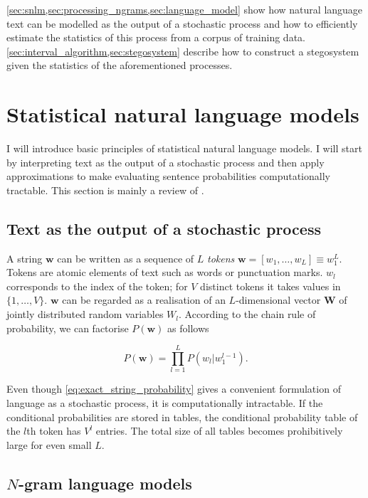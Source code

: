 \documentclass[draft]{IIBproject}
\begin{document}
\cref{sec:snlm,sec:processing_ngrams,sec:language_model} show how natural language text can be modelled as the output of a stochastic process and how to efficiently estimate the statistics of this process from a corpus of training data. \cref{sec:interval_algorithm,sec:stegosystem} describe how to construct a stegosystem given the statistics of the aforementioned processes.

\clearpage
\section{Statistical natural language models}
\label{sec:snlm}

I will introduce basic principles of statistical natural language models. I will start by interpreting text as the output of a stochastic process and then apply approximations to make evaluating sentence probabilities computationally tractable. This section is mainly a review of \cite{4f11:statistical_language_models, 4f11:smt_systems, coursera:nlp}.

\FloatBarrier
\subsection{Text as the output of a stochastic process}

A string $\mathbf w$ can be written as a sequence of $L$ \emph{tokens} $\mathbf w = [ w_1, \dots, w_L ] \equiv w_1^L$. Tokens are atomic elements of text such as words or punctuation marks. $w_l$ corresponds to the index of the token; for $V$ distinct tokens it takes values in $\{1, \dots, V\}$. $\mathbf w$ can be regarded as a realisation of an $L$-dimensional vector $\mathbf W$ of jointly distributed random variables $W_l$. According to the chain rule of probability, we can factorise $P(\mathbf w)$ as follows

\begin{equation}
\label{eq:exact_string_probability}
P(\mathbf w) = \prod_{l=1}^{L} P( w_l | w_1^{l-1} ) .
\end{equation}

Even though \cref{eq:exact_string_probability} gives a convenient formulation of language as a stochastic process, it is computationally intractable. If the conditional probabilities are stored in tables, the conditional probability table of the $l$th token has $V^l$ entries. The total size of all tables becomes prohibitively large for even small $L$.

\FloatBarrier
\subsection{$N$-gram language models}
\end{document}
